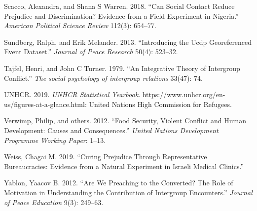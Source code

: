 \documentclass[11pt]{article}
\begin{document}
\leavevmode\hypertarget{ref-scacco2018nigeria}{}%
Scacco, Alexandra, and Shana S Warren. 2018. ``Can Social Contact Reduce
Prejudice and Discrimination? Evidence from a Field Experiment in
Nigeria.'' \emph{American Political Science Review} 112(3): 654--77.

\leavevmode\hypertarget{ref-ucdp}{}%
Sundberg, Ralph, and Erik Melander. 2013. ``Introducing the Ucdp
Georeferenced Event Dataset.'' \emph{Journal of Peace Research} 50(4):
523--32.

\leavevmode\hypertarget{ref-tajfel1979integrative}{}%
Tajfel, Henri, and John C Turner. 1979. ``An Integrative Theory of
Intergroup Conflict.'' \emph{The social psychology of intergroup
relations} 33(47): 74.

\leavevmode\hypertarget{ref-unhcr2019}{}%
UNHCR. 2019. \emph{UNHCR Statistical Yearbook}.
https://www.unhcr.org/en-us/figures-at-a-glance.html: United Nations
High Commission for Refugees.

\leavevmode\hypertarget{ref-verwimp2012food}{}%
Verwimp, Philip, and others. 2012. ``Food Security, Violent Conflict and
Human Development: Causes and Consequences.'' \emph{United Nations
Development Programme Working Paper}: 1--13.

\leavevmode\hypertarget{ref-weiss2019curing}{}%
Weiss, Chagai M. 2019. ``Curing Prejudice Through Representative
Bureaucracies: Evidence from a Natural Experiment in Israeli Medical
Clinics.''

\leavevmode\hypertarget{ref-yablon2012we}{}%
Yablon, Yaacov B. 2012. ``Are We Preaching to the Converted? The Role of
Motivation in Understanding the Contribution of Intergroup Encounters.''
\emph{Journal of Peace Education} 9(3): 249--63.
\end{document}
